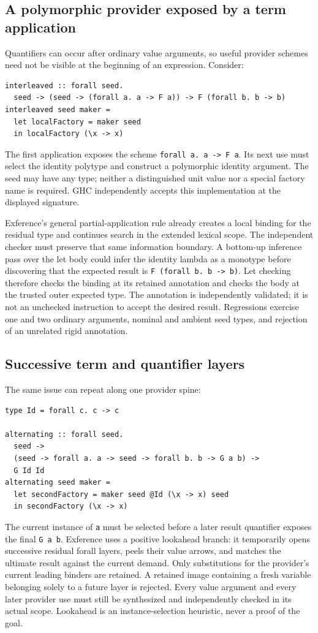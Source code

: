 \documentclass[11pt]{article}
\newcommand{\code}[1]{\texttt{#1}}
\begin{document}
\subsection{A polymorphic provider exposed by a term application}

Quantifiers can occur after ordinary value arguments, so useful provider
schemes need not be visible at the beginning of an expression. Consider:
\begin{lstlisting}
interleaved :: forall seed.
  seed -> (seed -> (forall a. a -> F a)) -> F (forall b. b -> b)
interleaved seed maker =
  let localFactory = maker seed
  in localFactory (\x -> x)
\end{lstlisting}
The first application exposes the scheme
\code{forall a. a -> F a}. Its next use must select the identity polytype
and construct a polymorphic identity argument. The seed may have any type;
neither a distinguished unit value nor a special factory name is required.
GHC independently accepts this implementation at the displayed signature.

Exference's general partial-application rule already creates a local binding
for the residual type and continues search in the extended lexical scope.
The independent checker must preserve that same information boundary. A
bottom-up inference pass over the let body could infer the identity lambda
as a monotype before discovering that the expected result is
\code{F (forall b. b -> b)}. Let checking therefore checks the binding at
its retained annotation and checks the body at the trusted outer expected
type. The annotation is independently validated; it is not an unchecked
instruction to accept the desired result. Regressions exercise one and two
ordinary arguments, nominal and ambient seed types, and rejection of an
unrelated rigid annotation.

\subsection{Successive term and quantifier layers}

The same issue can repeat along one provider spine:
\begin{lstlisting}
type Id = forall c. c -> c

alternating :: forall seed.
  seed ->
  (seed -> forall a. a -> seed -> forall b. b -> G a b) ->
  G Id Id
alternating seed maker =
  let secondFactory = maker seed @Id (\x -> x) seed
  in secondFactory (\x -> x)
\end{lstlisting}
The current instance of \code{a} must be selected before a later result
quantifier exposes the final \code{G a b}. Exference uses a positive
lookahead branch: it temporarily opens successive residual forall layers,
peels their value arrows, and matches the ultimate result against the current
demand. Only substitutions for the provider's current leading binders are
retained. A retained image containing a fresh variable belonging solely to a
future layer is rejected. Every value argument and every later provider use
must still be synthesized and independently checked in its actual scope.
Lookahead is an instance-selection heuristic, never a proof of the goal.
\end{document}
